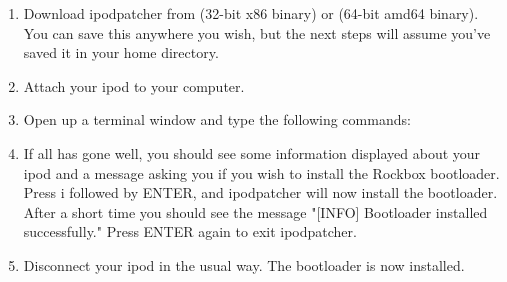 \begin{enumerate} 

\item Download ipodpatcher from 
 (32-bit x86 
binary) or  
(64-bit amd64 binary). You can save this anywhere you wish, but the next 
steps will assume you've saved it in your home directory.

\item Attach your ipod to your computer.

\item Open up a terminal window and type the following commands:



\item If all has gone well, you should see some information displayed about
your ipod and a message asking you if you wish to install the Rockbox 
bootloader. Press i followed by ENTER, and ipodpatcher will now install the 
bootloader. After a short time you should see the message "[INFO] Bootloader 
installed successfully." Press ENTER again to exit ipodpatcher.

\item Disconnect your ipod in the usual way. The bootloader is now installed. 

\end{enumerate} 
